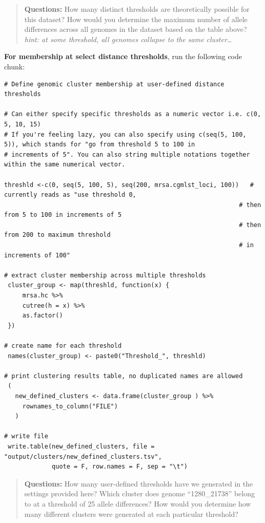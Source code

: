 \documentclass[
]{book}
\begin{document}
\begin{quote}
\textbf{Questions:} How many distinct thresholds are theoretically possible for this dataset? How would you determine the maximum number of allele differences across all genomes in the dataset based on the table above? \emph{hint: at some threshold, all genomes collapse to the same cluster\ldots{}}
\end{quote}

\textbf{For membership at select distance thresholds}, run the following code chunk:

\begin{verbatim}
# Define genomic cluster membership at user-defined distance thresholds

# Can either specify specific thresholds as a numeric vector i.e. c(0, 5, 10, 15) 
# If you're feeling lazy, you can also specify using c(seq(5, 100, 5)), which stands for "go from threshold 5 to 100 in
# increments of 5". You can also string multiple notations together within the same numerical vector.  

threshld <-c(0, seq(5, 100, 5), seq(200, mrsa.cgmlst_loci, 100))   # currently reads as "use threshold 0, 
                                                                # then from 5 to 100 in increments of 5
                                                                # then from 200 to maximum threshold 
                                                                # in increments of 100"

# extract cluster membership across multiple thresholds
 cluster_group <- map(threshld, function(x) {
     mrsa.hc %>%
     cutree(h = x) %>%
     as.factor()
 })

# create name for each threshold
 names(cluster_group) <- paste0("Threshold_", threshld)

# print clustering results table, no duplicated names are allowed
 (
   new_defined_clusters <- data.frame(cluster_group ) %>%
     rownames_to_column("FILE")
   )

# write file
 write.table(new_defined_clusters, file = "output/clusters/new_defined_clusters.tsv",
             quote = F, row.names = F, sep = "\t")

\end{verbatim}

\begin{quote}
\textbf{Questions:} How many user-defined thresholds have we generated in the settings provided here? Which cluster does genome ``1280\_21738'' belong to at a threshold of 25 allele differences? How would you determine how many different clusters were generated at each particular threshold?
\end{quote}
\end{document}

